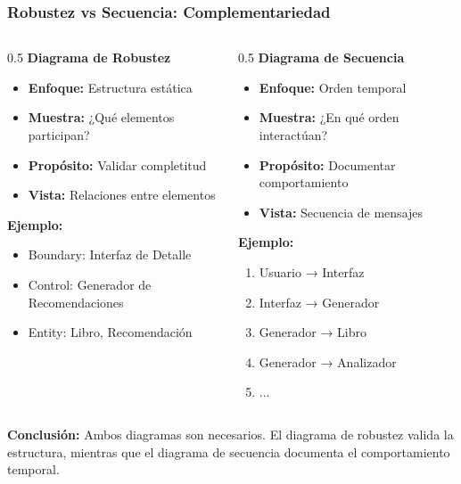 \documentclass[aspectratio=169]{beamer}
\begin{document}
\begin{frame}
\frametitle{Robustez vs Secuencia: Complementariedad}

\begin{columns}
\begin{column}{0.5\textwidth}
\textbf{Diagrama de Robustez}
\begin{itemize}
\item \textbf{Enfoque:} Estructura estática
\item \textbf{Muestra:} ¿Qué elementos participan?
\item \textbf{Propósito:} Validar completitud
\item \textbf{Vista:} Relaciones entre elementos
\end{itemize}

\vspace{0.3cm}

\textbf{Ejemplo:}
\begin{itemize}
\item Boundary: Interfaz de Detalle
\item Control: Generador de Recomendaciones
\item Entity: Libro, Recomendación
\end{itemize}
\end{column}

\begin{column}{0.5\textwidth}
\textbf{Diagrama de Secuencia}
\begin{itemize}
\item \textbf{Enfoque:} Orden temporal
\item \textbf{Muestra:} ¿En qué orden interactúan?
\item \textbf{Propósito:} Documentar comportamiento
\item \textbf{Vista:} Secuencia de mensajes
\end{itemize}

\vspace{0.3cm}

\textbf{Ejemplo:}
\begin{enumerate}
\item Usuario → Interfaz
\item Interfaz → Generador
\item Generador → Libro
\item Generador → Analizador
\item ...
\end{enumerate}
\end{column}
\end{columns}

\vspace{0.5cm}

\begin{tcolorbox}[colback=yellow!5, colframe=yellow!50]
\textbf{Conclusión:} Ambos diagramas son necesarios. El diagrama de robustez valida la estructura, mientras que el diagrama de secuencia documenta el comportamiento temporal.
\end{tcolorbox}

\end{frame}
\end{document}
